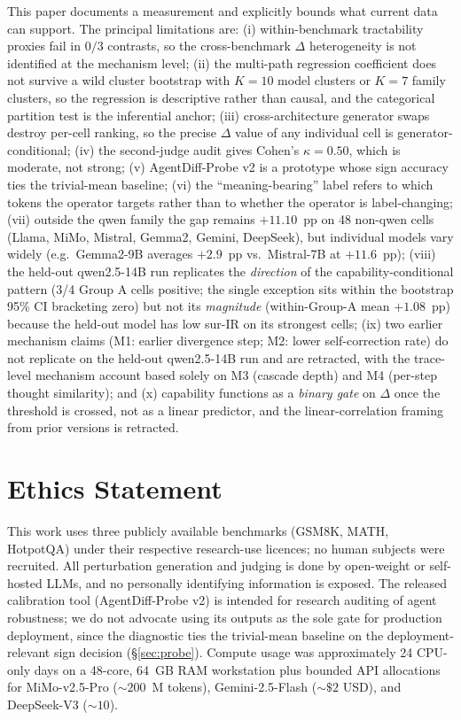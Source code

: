 \documentclass[11pt]{article}
\begin{document}
This paper documents a measurement and explicitly bounds what current data can support. The principal limitations are: (i) within-benchmark tractability proxies fail in $0/3$ contrasts, so the cross-benchmark $\Delta$ heterogeneity is not identified at the mechanism level; (ii) the multi-path regression coefficient does not survive a wild cluster bootstrap with $K{=}10$ model clusters or $K{=}7$ family clusters, so the regression is descriptive rather than causal, and the categorical partition test is the inferential anchor; (iii) cross-architecture generator swaps destroy per-cell ranking, so the precise $\Delta$ value of any individual cell is generator-conditional; (iv) the second-judge audit gives Cohen's $\kappa{=}0.50$, which is moderate, not strong; (v) AgentDiff-Probe v2 is a prototype whose sign accuracy ties the trivial-mean baseline; (vi) the ``meaning-bearing'' label refers to which tokens the operator targets rather than to whether the operator is label-changing; (vii) outside the qwen family the gap remains $+11.10$~pp on 48 non-qwen cells (Llama, MiMo, Mistral, Gemma2, Gemini, DeepSeek), but individual models vary widely (e.g.\ Gemma2-9B averages $+2.9$~pp vs.\ Mistral-7B at $+11.6$~pp); (viii) the held-out qwen2.5-14B run replicates the \emph{direction} of the capability-conditional pattern (3/4 Group A cells positive; the single exception sits within the bootstrap 95\% CI bracketing zero) but not its \emph{magnitude} (within-Group-A mean $+1.08$~pp) because the held-out model has low sur-IR on its strongest cells; (ix) two earlier mechanism claims (M1: earlier divergence step; M2: lower self-correction rate) do not replicate on the held-out qwen2.5-14B run and are retracted, with the trace-level mechanism account based solely on M3 (cascade depth) and M4 (per-step thought similarity); and (x) capability functions as a \emph{binary gate} on $\Delta$ once the threshold is crossed, not as a linear predictor, and the linear-correlation framing from prior versions is retracted.

\section*{Ethics Statement}

This work uses three publicly available benchmarks (GSM8K, MATH, HotpotQA) under their respective research-use licences; no human subjects were recruited. All perturbation generation and judging is done by open-weight or self-hosted LLMs, and no personally identifying information is exposed. The released calibration tool (AgentDiff-Probe v2) is intended for research auditing of agent robustness; we do not advocate using its outputs as the sole gate for production deployment, since the diagnostic ties the trivial-mean baseline on the deployment-relevant sign decision (\S\ref{sec:probe}). Compute usage was approximately 24 CPU-only days on a 48-core, 64~GB RAM workstation plus bounded API allocations for MiMo-v2.5-Pro (${\sim}200$~M tokens), Gemini-2.5-Flash (${\sim}\$2$ USD), and DeepSeek-V3 (${\sim}$\textyen$10$).


\end{document}
